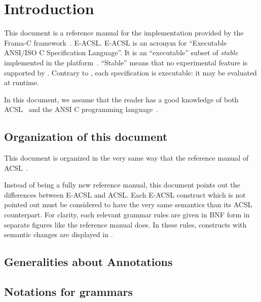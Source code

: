 \chapter{Introduction}

This document is a reference manual for
%
{the \eacsl implementation provided by the Frama-C
  framework~\cite{frama-c}.}%
{E-ACSL.}
E-ACSL is an acronym for ``Executable ANSI/ISO C
Specification Language''. It is an ``executable'' subset of
\emph{stable} \acsl~\cite{acsl} implemented in the \framac
platform~\cite{framac}. ``Stable'' means that no experimental \acsl feature is
supported by \eacsl. Contrary to \acsl, each \eacsl specification is
executable: it may be evaluated at runtime.

In this document, we assume that the reader has a good knowledge of both
ACSL~\cite{acsl} and the ANSI C programming language~\cite{KR88,standardc99}.

\section{Organization of this document}

This document is organized in the very same way that the reference manual of
ACSL~\cite{acsl}.

Instead of being a fully new reference manual, this document points out the
differences between E-ACSL and ACSL. Each E-ACSL construct which is not pointed
out must be considered to have the very same semantics than its ACSL
counterpart. For clarity, each relevant grammar rules are given in BNF form
in separate figures like the \acsl reference manual does. In these rules,
constructs with semantic changes are displayed in .

\section{Generalities about Annotations}\label{sec:gener-about-annot}
\nodiff

\section{Notations for grammars}
\nodiff
